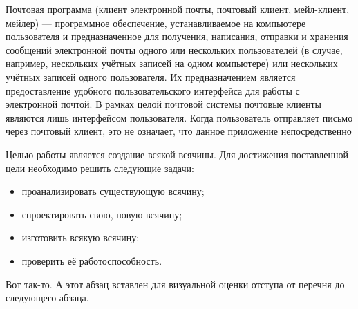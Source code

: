 \Introduction

Почтовая программа (клиент электронной почты, почтовый клиент, мейл-клиент, мейлер) — программное обеспечение, устанавливаемое на компьютере пользователя и предназначенное для получения, написания, отправки и хранения сообщений электронной почты одного или нескольких пользователей (в случае, например, нескольких учётных записей на одном компьютере) или нескольких учётных записей одного пользователя. Их предназначением является предоставление удобного пользовательского интерфейса для работы с электронной почтой. В рамках целой почтовой системы почтовые клиенты являются лишь интерфейсом пользователя. Когда пользователь отправляет письмо через почтовый клиент, это не означает, что данное приложение непосредственно 



Целью работы является создание всякой всячины. Для достижения поставленной цели необходимо решить следующие задачи:

\begin{itemize}
\item проанализировать существующую всячину;
\item спроектировать свою, новую всячину;
\item изготовить всякую всячину;
\item проверить её работоспособность.
\end{itemize}

Вот так-то. А этот абзац вставлен для визуальной оценки отступа от перечня до следующего абзаца.